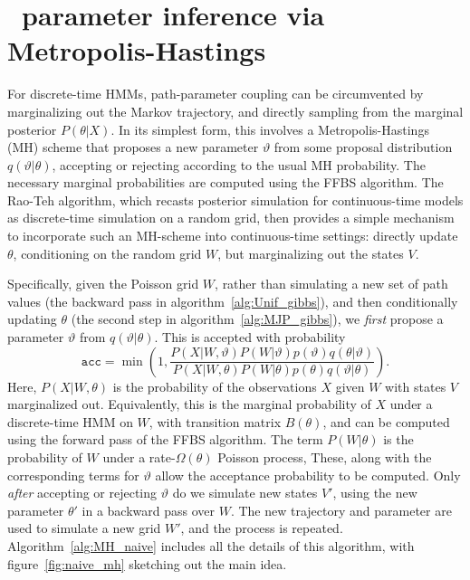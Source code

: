 \section{\Naive\ parameter inference via Metropolis-Hastings}
For discrete-time HMMs, path-parameter coupling can be circumvented by marginalizing out the Markov trajectory, and directly sampling from the marginal posterior $P(\theta|X)$.
In its simplest form, this involves a Metropolis-Hastings (MH) scheme that proposes a new parameter $\vartheta$ from some proposal distribution $q(\vartheta|\theta)$, accepting or rejecting according to the usual MH probability.
The necessary marginal probabilities are computed using the FFBS algorithm.
The Rao-Teh algorithm, which recasts posterior simulation for continuous-time models as discrete-time simulation on a random grid, then provides a simple mechanism to incorporate such an MH-scheme into continuous-time settings: directly update $\theta$, conditioning on the random grid $W$, but marginalizing out the states $V$.

Specifically, given the Poisson grid $W$, rather than simulating a new set of path values (the backward pass in algorithm~\ref{alg:Unif_gibbs}), and then conditionally updating $\theta$ (the second step in algorithm~\ref{alg:MJP_gibbs}), we {\em first} propose a parameter $\vartheta$ from $q(\vartheta|\theta)$. This is accepted with probability 
$$ \texttt{acc} = \min\left(1, 
\frac{P(X|W,\vartheta) P(W|\vartheta)p(\vartheta)q(\theta|\vartheta)} {P(X|W,\theta) P(W|\theta)p(\theta)q(\vartheta|\theta)}\right).$$ 
Here, $P(X|W,\theta)$ is the probability of the observations $X$ given $W$ with states $V$ marginalized out. 
Equivalently, this is the marginal probability of $X$ under a discrete-time HMM on $W$, with transition matrix $B(\theta)$, and can be computed using the forward pass of the FFBS algorithm. 
The term $P(W|\theta)$ is the probability of $W$ under a rate-$\Omega(\theta)$ Poisson process, 
These, along with the corresponding terms for $\vartheta$ allow the acceptance probability to be computed.
Only {\em after} accepting or rejecting $\vartheta$ do we simulate new states $V'$, using the new parameter $\theta'$ in a backward pass over $W$. 
The new trajectory and parameter are used to simulate a new grid $W'$, and the process is repeated.
Algorithm~\ref{alg:MH_naive} includes all the details of this algorithm, with figure~\ref{fig:naive_mh} sketching out the main idea.

